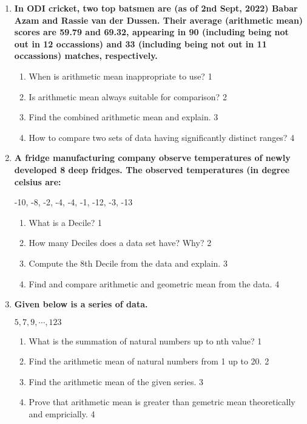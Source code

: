 \documentclass[a4paper,oneside]{book}
\begin{document}
\begin{enumerate}
 \item
	  \textbf{In ODI cricket, two top batsmen are (as of 2nd Sept, 2022) Babar Azam and Rassie van der Dussen. Their average (arithmetic mean) scores are 59.79 and 69.32, appearing in 90 (including being not out in 12 occassions) and 33 (including being not out in 11 occassions) matches, respectively.} 
  
  \begin{enumerate}
    \item
	When is arithmetic mean inappropriate to use? \hfill 1
    \item
	Is arithmetic mean always suitable for comparison? \hfill 2
    \item  
	Find the combined arithmetic mean and explain. \hfill 3
    \item
	How to compare two sets of data having significantly distinct ranges? \hfill 4
  \end{enumerate}
  
   \item
	  \textbf{A fridge manufacturing company observe temperatures of newly developed 8 deep fridges. The observed temperatures (in degree celsius are:} 
	  
	    \begin{center}
-10, -8, -2, -4, -4, -1, -12, -3, -13
  \end{center}
  
  \begin{enumerate}
    \item
	What is a Decile? \hfill 1
    \item
	How many Deciles does a data set have? Why? \hfill 2
    \item  
	Compute the 8th Decile from the data and explain. \hfill 3
    \item
	Find and compare arithmetic and geometric mean from the data. \hfill 4
  \end{enumerate}
  
   \item
	  \textbf{Given below is a series of data.} 
	  
	  	    \begin{center}
	 $5, 7, 9, \cdots , 123$
	    \end{center}
  
  \begin{enumerate}
    \item
	What is the summation of natural numbers up to nth value? \hfill 1
    \item
	Find the arithmetic mean of natural numbers from 1 up to 20. \hfill 2
    \item  
	Find the arithmetic mean of the given series. \hfill 3
    \item
	Prove that arithmetic mean is greater than gemetric mean theoretically and empricially. \hfill 4
  \end{enumerate}
  

\end{enumerate}
\end{document}
